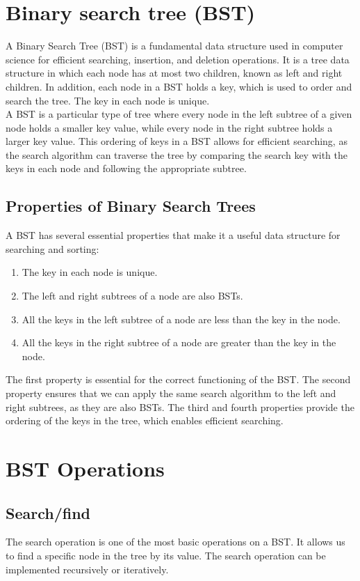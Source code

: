 \documentclass[a4paper, 11pt, oneside]{book} %
\begin{document}
\section{Binary search tree (BST)}
A Binary Search Tree (BST) is a fundamental data structure used in computer science for efficient searching, insertion, and deletion operations. It is a tree data structure in which each node has at most two children, known as left and right children. In addition, each node in a BST holds a key, which is used to order and search the tree. The key in each node is unique.
\\

A BST is a particular type of tree where every node in the left subtree of a given node holds a smaller key value, while every node in the right subtree holds a larger key value. This ordering of keys in a BST allows for efficient searching, as the search algorithm can traverse the tree by comparing the search key with the keys in each node and following the appropriate subtree.

\subsection{Properties of Binary Search Trees}
A BST has several essential properties that make it a useful data structure for searching and sorting:

\begin{enumerate}
    \item The key in each node is unique.
    \item The left and right subtrees of a node are also BSTs.
    \item All the keys in the left subtree of a node are less than the key in the node.
    \item All the keys in the right subtree of a node are greater than the key in the node.
\end{enumerate}
The first property is essential for the correct functioning of the BST. The second property ensures that we can apply the same search algorithm to the left and right subtrees, as they are also BSTs. The third and fourth properties provide the ordering of the keys in the tree, which enables efficient searching.


\section{BST Operations}
\subsection{Search/find}
The search operation is one of the most basic operations on a BST. It allows us to find a specific node in the tree by its value. The search operation can be implemented recursively or iteratively.
\end{document}
